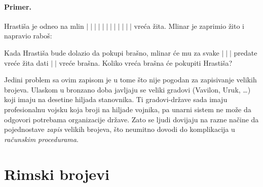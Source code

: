 \paragraph{Primer.} Hrasti\v sa je odneo na mlin $|\;|\;|\;|\;|\;|\;|\;|\;|\;|\;|\;|$ vre\'ca \v zita.
Mlinar je zaprimio \v zito i napravio rabo\v s:

\begin{center}
    
\end{center}

Kada Hrasti\v sa bude dolazio da pokupi bra\v sno, mlinar \'ce mu za svake $|\;|\;|$ predate vre\'ce \v zita dati $|\;|$ vre\'ce bra\v sna.
Koliko vre\'ca bra\v sna \'ce pokupiti Hrasti\v sa?

\medskip

Jedini problem sa ovim zapisom je u tome \v sto nije pogodan za zapisivanje velikih brojeva. Ulaskom u bronzano doba
javljaju se veliki gradovi (Vavilon, Uruk, \ldots) koji imaju na desetine hiljada stanovnika. Ti gradovi-dr\v zave
sada imaju profesionalnu vojsku koja broji na hiljade vojnika, pa unarni sistem ne mo\v ze da odgovori potrebama
organizacije dr\v zave. Zato se ljudi dovijaju na razne na\v cine da pojednostave \emph{zapis} velikih brojeva, \v sto
neumitno dovodi do komplikacija u \emph{ra\v cunskim procedurama}.

\section{Rimski brojevi}

